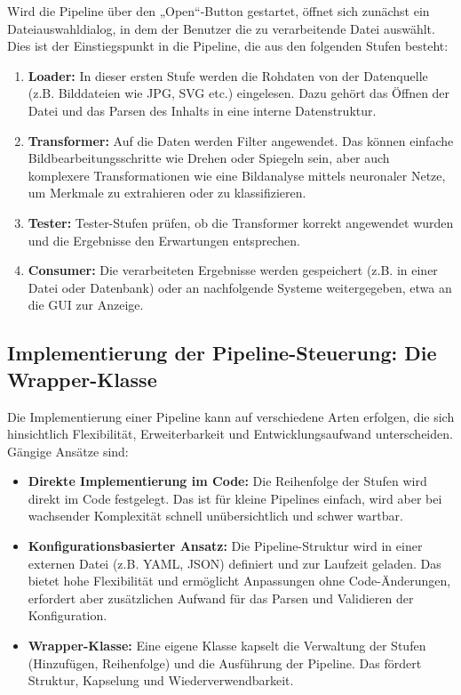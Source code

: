 \documentclass[10pt,a4paper]{article}
\begin{document}
Wird die Pipeline über den „Open“-Button gestartet, öffnet sich zunächst ein Dateiauswahldialog, in dem der Benutzer die zu verarbeitende Datei auswählt. Dies ist der Einstiegspunkt in die Pipeline, die aus den folgenden Stufen besteht:

\begin{enumerate}
    \item \textbf{Loader:} In dieser ersten Stufe werden die Rohdaten von der Datenquelle (z.B. Bilddateien wie JPG, SVG etc.) eingelesen. Dazu gehört das Öffnen der Datei und das Parsen des Inhalts in eine interne Datenstruktur.
    \item \textbf{Transformer:} Auf die Daten werden Filter angewendet. Das können einfache Bildbearbeitungsschritte wie Drehen oder Spiegeln sein, aber auch komplexere Transformationen wie eine Bildanalyse mittels neuronaler Netze, um Merkmale zu extrahieren oder zu klassifizieren.
    \item \textbf{Tester:} Tester-Stufen prüfen, ob die Transformer korrekt angewendet wurden und die Ergebnisse den Erwartungen entsprechen.
    \item \textbf{Consumer:} Die verarbeiteten Ergebnisse werden gespeichert (z.B. in einer Datei oder Datenbank) oder an nachfolgende Systeme weitergegeben, etwa an die GUI zur Anzeige.
\end{enumerate}


\subsection{Implementierung der Pipeline-Steuerung: Die Wrapper-Klasse}
Die Implementierung einer Pipeline kann auf verschiedene Arten erfolgen, die sich hinsichtlich Flexibilität, Erweiterbarkeit und Entwicklungsaufwand unterscheiden. Gängige Ansätze sind:

\begin{itemize}
    \item \textbf{Direkte Implementierung im Code:} Die Reihenfolge der Stufen wird direkt im Code festgelegt. Das ist für kleine Pipelines einfach, wird aber bei wachsender Komplexität schnell unübersichtlich und schwer wartbar.
    \item \textbf{Konfigurationsbasierter Ansatz:} Die Pipeline-Struktur wird in einer externen Datei (z.B. YAML, JSON) definiert und zur Laufzeit geladen. Das bietet hohe Flexibilität und ermöglicht Anpassungen ohne Code-Änderungen, erfordert aber zusätzlichen Aufwand für das Parsen und Validieren der Konfiguration.
    \item \textbf{Wrapper-Klasse:} Eine eigene Klasse kapselt die Verwaltung der Stufen (Hinzufügen, Reihenfolge) und die Ausführung der Pipeline. Das fördert Struktur, Kapselung und Wiederverwendbarkeit.
\end{itemize}
\end{document}
